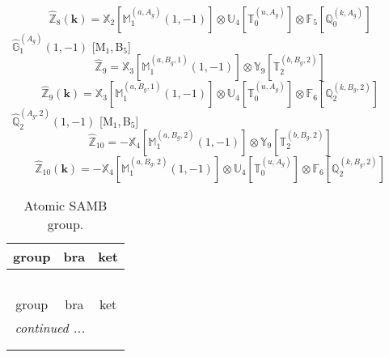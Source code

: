 \documentclass[fleqn,10pt,landscape]{article}
\begin{document}
\begin{itemize}
\begin{dmath*}
\hat{\mathbb{Z}}_{8}(\bm{k})=\mathbb{X}_{2}[\mathbb{M}_{1}^{(a,A_{g})}(1,-1)] \otimes\mathbb{U}_{4}[\mathbb{T}_{0}^{(u,A_{g})}] \otimes\mathbb{F}_{5}[\mathbb{Q}_{0}^{(k,A_{g})}]
\end{dmath*}
\vspace{4mm}
\noindent {} $\,\,\,\hat{\mathbb{G}}_{1}^{(A_{g})}(1,-1)$ [M$_{1}$,\,B$_{5}$]
\begin{dmath*}
\hat{\mathbb{Z}}_{9}=\mathbb{X}_{3}[\mathbb{M}_{1}^{(a,B_{g},1)}(1,-1)] \otimes\mathbb{Y}_{9}[\mathbb{T}_{2}^{(b,B_{g},2)}]
\end{dmath*}
\begin{dmath*}
\hat{\mathbb{Z}}_{9}(\bm{k})=\mathbb{X}_{3}[\mathbb{M}_{1}^{(a,B_{g},1)}(1,-1)] \otimes\mathbb{U}_{4}[\mathbb{T}_{0}^{(u,A_{g})}] \otimes\mathbb{F}_{6}[\mathbb{Q}_{2}^{(k,B_{g},2)}]
\end{dmath*}
\vspace{4mm}
\noindent {} $\,\,\,\hat{\mathbb{Q}}_{2}^{(A_{g},2)}(1,-1)$ [M$_{1}$,\,B$_{5}$]
\begin{dmath*}
\hat{\mathbb{Z}}_{10}=- \mathbb{X}_{4}[\mathbb{M}_{1}^{(a,B_{g},2)}(1,-1)] \otimes\mathbb{Y}_{9}[\mathbb{T}_{2}^{(b,B_{g},2)}]
\end{dmath*}
\begin{dmath*}
\hat{\mathbb{Z}}_{10}(\bm{k})=- \mathbb{X}_{4}[\mathbb{M}_{1}^{(a,B_{g},2)}(1,-1)] \otimes\mathbb{U}_{4}[\mathbb{T}_{0}^{(u,A_{g})}] \otimes\mathbb{F}_{6}[\mathbb{Q}_{2}^{(k,B_{g},2)}]
\end{dmath*}
\begin{center}
\renewcommand{\arraystretch}{1.3}
\begin{longtable}{c|c|c}
\caption{Atomic SAMB group.}
 \\
 \hline \hline
group & bra & ket \\ \hline \endfirsthead

\multicolumn{2}{l}{\tablename\ \thetable{}} \\
 \hline \hline
group & bra & ket \\ \hline \endhead

 \hline \hline
\multicolumn{2}{r}{\footnotesize\it continued ...} \\ \endfoot

 \hline \hline
\multicolumn{2}{r}{} \\ \endlastfoot


\end{longtable}
\end{center}
\end{itemize}
\end{document}
